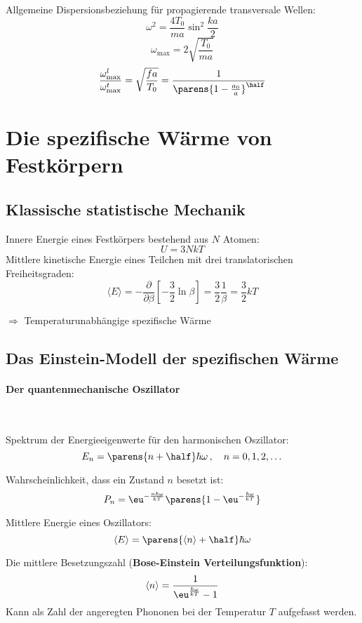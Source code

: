 		Allgemeine Dispersionsbeziehung für propagierende transversale Wellen:
		\[
			\omega^2 = \frac{4 T_0}{ma} \sin^2 \frac{ka}{2}
		\]
		\[
			\omega_\text{max} = 2 \sqrt{\frac{T_0}{ma}}
		\]
		\[
			\frac{\omega_\text{max}^l}{\omega_\text{max}^t} = \sqrt{\frac{fa}{T_0}} = \frac{1}{\parens{1-\frac{a_0}{a}}^\half}
		\]
\section{Die spezifische Wärme von Festkörpern} %
	\subsection{Klassische statistische Mechanik} %
		Innere Energie eines Festkörpers bestehend aus $N$ Atomen:
		\[
			U = 3NkT
		\]
		Mittlere kinetische Energie eines Teilchen mit drei translatorischen Freiheitsgraden:
		\[
			\langle E \rangle = -\frac{\partial}{\partial \beta} \left[-\frac 3 2 \ln \beta \right] = \frac 3 2 \frac 1 \beta = \frac 3 2 kT
		\]
		
		$\Rightarrow$ Temperaturunabhängige spezifische Wärme
	\subsection{Das Einstein-Modell der spezifischen Wärme} %
		\paragraph{Der quantenmechanische Oszillator} %
			~
			
			Spektrum der Energieeigenwerte für den harmonischen Oszillator:
			\[
				E_n = \parens{n + \half} \hbar \omega \,,\quad n = 0,1,2,\dots
			\]

			Wahrscheinlichkeit, dass ein Zustand $n$ besetzt ist:
			\[
				P_n = \eu^{-\frac{n\hbar\omega}{kT}}\parens{1 - \eu^{-\frac{\hbar\omega}{kT}}}
			\]

			Mittlere Energie eines Oszillators:
			\[
				\langle E \rangle = \parens{\langle n \rangle + \half} \hbar \omega
			\]

			Die mittlere Besetzungszahl (\textbf{Bose-Einstein Verteilungsfunktion}):
			\[
				\langle n \rangle = \frac{1}{\eu^{\frac{\hbar\omega}{kT}} - 1}
			\]
			Kann als Zahl der angeregten Phononen bei der Temperatur $T$ aufgefasst werden.
